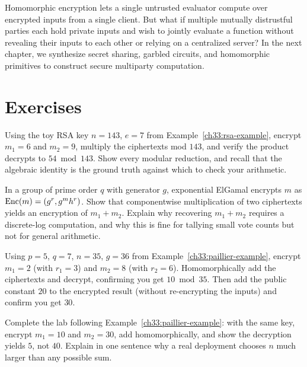 Homomorphic encryption lets a single untrusted evaluator compute over encrypted inputs from a single client. But what if multiple mutually distrustful parties each hold private inputs and wish to jointly evaluate a function without revealing their inputs to each other or relying on a centralized server? In the next chapter, we synthesize secret sharing, garbled circuits, and homomorphic primitives to construct secure multiparty computation.

\section{Exercises}
\label{ch33:exercises}

\begin{exercise}
Using the toy RSA key $n=143$, $e=7$ from Example~\ref{ch33:rsa-example}, encrypt $m_1 = 6$ and $m_2 = 9$, multiply the ciphertexts mod $143$, and verify the product decrypts to $54 \bmod 143$. Show every modular reduction, and recall that the algebraic identity is the ground truth against which to check your arithmetic.
\end{exercise}

\begin{exercise}
In a group of prime order $q$ with generator $g$, exponential ElGamal encrypts $m$ as $\operatorname{Enc}(m) = (g^r, g^m h^r)$. Show that componentwise multiplication of two ciphertexts yields an encryption of $m_1 + m_2$. Explain why recovering $m_1 + m_2$ requires a discrete-log computation, and why this is fine for tallying small vote counts but not for general arithmetic.
\end{exercise}

\begin{exercise}
Using $p=5$, $q=7$, $n=35$, $g=36$ from Example~\ref{ch33:paillier-example}, encrypt $m_1 = 2$ (with $r_1 = 3$) and $m_2 = 8$ (with $r_2 = 6$). Homomorphically add the ciphertexts and decrypt, confirming you get $10 \bmod 35$. Then add the public constant $20$ to the encrypted result (without re-encrypting the inputs) and confirm you get $30$.
\end{exercise}

\begin{exercise}
Complete the lab following Example~\ref{ch33:paillier-example}: with the same key, encrypt $m_1 = 10$ and $m_2 = 30$, add homomorphically, and show the decryption yields $5$, not $40$. Explain in one sentence why a real deployment chooses $n$ much larger than any possible sum.
\end{exercise}

